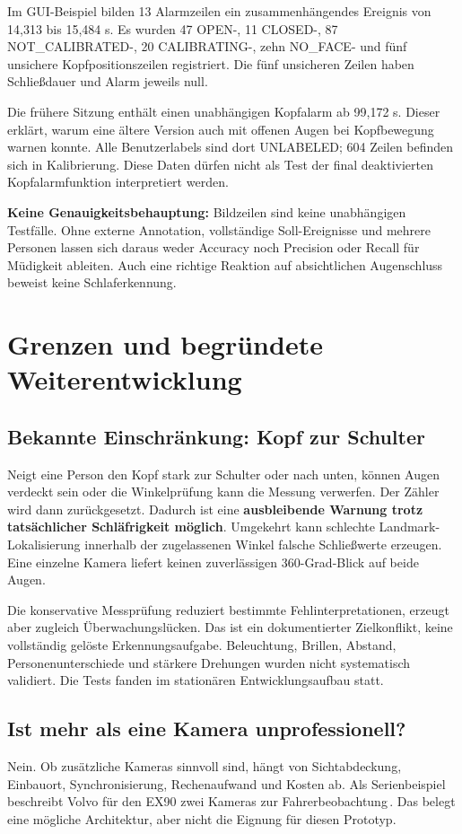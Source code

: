 \documentclass[11pt,a4paper]{article}
\begin{document}
Im GUI-Beispiel bilden 13 Alarmzeilen ein zusammenhängendes Ereignis von 14,313 bis 15,484 s. Es wurden 47 OPEN-, 11 CLOSED-, 87 NOT\_CALIBRATED-, 20 CALIBRATING-, zehn NO\_FACE- und fünf unsichere Kopfpositionszeilen registriert. Die fünf unsicheren Zeilen haben Schließdauer und Alarm jeweils null.

Die frühere Sitzung enthält einen unabhängigen Kopfalarm ab 99,172 s. Dieser erklärt, warum eine ältere Version auch mit offenen Augen bei Kopfbewegung warnen konnte. Alle Benutzerlabels sind dort UNLABELED; 604 Zeilen befinden sich in Kalibrierung. Diese Daten dürfen nicht als Test der final deaktivierten Kopfalarmfunktion interpretiert werden.

\textbf{Keine Genauigkeitsbehauptung:} Bildzeilen sind keine unabhängigen Testfälle. Ohne externe Annotation, vollständige Soll-Ereignisse und mehrere Personen lassen sich daraus weder Accuracy noch Precision oder Recall für Müdigkeit ableiten. Auch eine richtige Reaktion auf absichtlichen Augenschluss beweist keine Schlaferkennung.
\newpage
\enlargethispage{3\baselineskip}
\section{Grenzen und begründete Weiterentwicklung}
\subsection*{Bekannte Einschränkung: Kopf zur Schulter}
Neigt eine Person den Kopf stark zur Schulter oder nach unten, können Augen verdeckt sein oder die Winkelprüfung kann die Messung verwerfen. Der Zähler wird dann zurückgesetzt. Dadurch ist eine \textbf{ausbleibende Warnung trotz tatsächlicher Schläfrigkeit möglich}. Umgekehrt kann schlechte Landmark-Lokalisierung innerhalb der zugelassenen Winkel falsche Schließwerte erzeugen. Eine einzelne Kamera liefert keinen zuverlässigen 360-Grad-Blick auf beide Augen.

Die konservative Messprüfung reduziert bestimmte Fehlinterpretationen, erzeugt aber zugleich Überwachungslücken. Das ist ein dokumentierter Zielkonflikt, keine vollständig gelöste Erkennungsaufgabe. Beleuchtung, Brillen, Abstand, Personenunterschiede und stärkere Drehungen wurden nicht systematisch validiert. Die Tests fanden im stationären Entwicklungsaufbau statt.
\subsection*{Ist mehr als eine Kamera unprofessionell?}
Nein. Ob zusätzliche Kameras sinnvoll sind, hängt von Sichtabdeckung, Einbauort, Synchronisierung, Rechenaufwand und Kosten ab. Als Serienbeispiel beschreibt Volvo für den EX90 zwei Kameras zur Fahrerbeobachtung\,\cite{volvo}. Das belegt eine mögliche Architektur, aber nicht die Eignung für diesen Prototyp.
\end{document}
